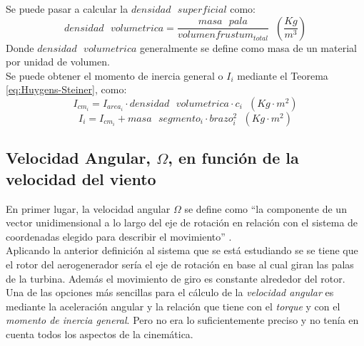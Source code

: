  
Se puede pasar a calcular la $densidad \text{ } superficial$ como:
  \begin{equation}
 densidad \text{ } volumetrica = \dfrac{masa \text{ } pala}{volumen frustum_{total} } \hspace{7pt} \left(\dfrac{Kg}{m^3}\right)
 \label{def:densidad_superficial}
 \end{equation}
 Donde $ densidad \text{ } volumetrica $ generalmente se define como masa de un material por unidad de volumen. \\
 
 
Se puede obtener el momento de inercia general o $I_i$ mediante el Teorema \ref{eq:Huygens-Steiner}, como:
  \begin{equation}
I_{cm_i} = I_{area_i} \cdot densidad \text{ } volumetrica \cdot c_i \hspace{7pt} (Kg \cdot m^2)
 \label{def:momento_inercia_cm}
 \end{equation}
 \begin{equation}
I_i = I_{cm_i} + masa \text{ } segmento_i \cdot brazo_i^2 \hspace{7pt} (Kg \cdot m^2)
 \label{def:momento_inercia_general}
 \end{equation}

 
\subsection{Velocidad Angular, $\Omega$, en función de la velocidad del viento }

En primer lugar, la velocidad angular $\Omega$ se define como ``la componente de un vector unidimensional a lo largo del eje de rotación en relación con el sistema de coordenadas elegido para describir el movimiento'' \cite[p.~303]{cummings2004understanding}.\\

Aplicando la anterior definición al sistema que se está estudiando se se tiene que el rotor del aerogenerador sería el eje de rotación en base al cual giran las palas de la turbina. Además el movimiento de giro es constante alrededor del rotor.\\

Una de las opciones más sencillas para el cálculo de la \textit{velocidad angular} es mediante la aceleración angular y la relación que tiene con el \textit{torque} y con el \textit{momento de inercia general}. Pero no era lo suficientemente preciso y no tenía en cuenta todos los aspectos de la cinemática. \\
 
